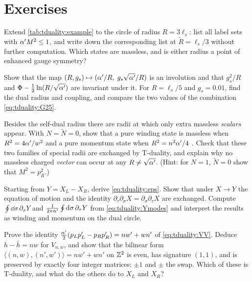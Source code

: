 \section*{Exercises}

\begin{exercise}[$\star$]
Extend \cref{tab:tduality:example} to the circle of radius $R=3\ell_s$: list all label sets with
$\alpha' M^2\le1$, and write down the corresponding list at $\tilde R=\ell_s/3$ without further
computation. Which states are massless, and is either radius a point of enhanced gauge symmetry?
\end{exercise}

\begin{exercise}[$\star$]
Show that the map $(R,g_s)\mapsto(\alpha'/R,\;g_s\sqrt{\alpha'}/R)$ is an involution and that
$g_s^2/R$ and $\Phi-\frac12\ln(R/\sqrt{\alpha'})$ are invariant under it. For $R=\ell_s/5$ and
$g_s=0.01$, find the dual radius and coupling, and compare the two values of the combination
\eqref{eq:tduality:G25}.
\end{exercise}

\begin{exercise}[$\star$]\label{ex:tduality:special}
Besides the self-dual radius there are radii at which only extra massless \emph{scalars}
appear. With $N=\tilde N=0$, show that a pure winding state is massless when $R^2=4\alpha'/w^2$ and
a pure momentum state when $R^2=n^2\alpha'/4$ . Check that these
two families of special radii are exchanged by T-duality, and explain why no massless charged
\emph{vector} can occur at any $R\ne\sqrt{\alpha'}$. (Hint: for $N=1$, $\tilde N=0$ show that
$M^2=p_R^2$.)
\end{exercise}

\begin{exercise}[$\star\star$]
Starting from $Y=X_L-X_R$, derive \eqref{eq:tduality:eps}. Show that under $X\to Y$ the
equation of motion and the identity $\partial_\tau\partial_\sigma X=\partial_\sigma\partial_\tau X$
are exchanged. Compute $\oint\dd\sigma\,\partial_\sigma Y$ and
$\frac1{2\pi\alpha'}\oint\mathrm{d}\sigma\,\partial_\tau Y$ from \eqref{eq:tduality:Ymodes} and interpret the
results as winding and momentum on the dual circle.
\end{exercise}

\begin{exercise}[$\star\star$]
Prove the identity $\frac{\alpha'}2(p_Lp_L'-p_Rp_R')=nw'+wn'$ of \eqref{eq:tduality:VV}. Deduce
$h-\bar h=nw$ for $V_{n,w}$, and show that the bilinear form $\langle(n,w),(n',w')\rangle=nw'+wn'$
on $\mathbb{Z}^2$ is even, has signature $(1,1)$, and is preserved by exactly four integer matrices:
$\pm1$ and $\pm$ the swap. Which of these is T-duality, and what do the others do to $X_L$ and
$X_R$?
\end{exercise}

